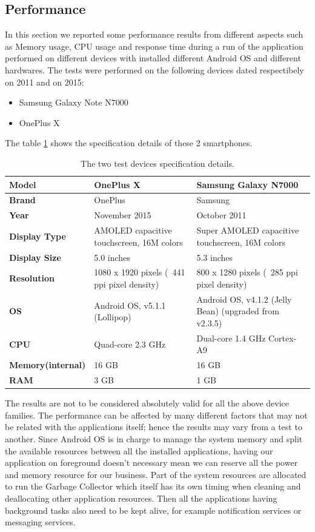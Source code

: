 \subsection{Performance}
In this section we reported some performance results from different aspects such as Memory usage, CPU usage and response time during a run of the application performed on different devices with installed different Android OS and different hardwares. The tests were performed on the following devices dated respectibely on 2011 and on 2015:
\begin{itemize}
	\item Samsung Galaxy Note N7000
	\item OnePlus X
\end{itemize}
The table \ref{tab10.1} shows the specification details of these 2 smartphones.\\
\begin{table}[h!]
	\centering
\begin{tabularx}{\textwidth}{|X|X|X|}
	\hline
		\textbf{Model}  & OnePlus X & Samsung Galaxy N7000  \\ \hline
		\textbf{Brand}  & OnePlus & Samsung \\ \hline
		\textbf{Year}  & November 2015 & October 2011 \\ \hline
		\textbf{Display Type}  & AMOLED capacitive touchscreen, 16M colors & Super AMOLED capacitive touchscreen, 16M colors \\ \hline
		\textbf{Display Size}  & 5.0 inches & 5.3 inches \\ \hline
		\textbf{Resolution}  & 1080 x 1920 pixels (~441 ppi pixel density) &  800 x 1280 pixels (~285 ppi pixel density) \\ \hline
		\textbf{OS}  & Android OS, v5.1.1 (Lollipop) & Android OS, v4.1.2 (Jelly Bean) (upgraded from v2.3.5) \\ \hline
		\textbf{CPU}  & Quad-core 2.3 GHz & Dual-core 1.4 GHz Cortex-A9 \\ \hline
		\textbf{Memory(internal)}\vline  & 16 GB & 16 GB \\ \hline
		\textbf{RAM}  & 3 GB & 1 GB \\ \hline
		
	\end{tabularx}
	\caption{The two test devices specification details.}
	\label{tab10.1}
\end{table}
The results are not to be considered absolutely valid for all the above device families. The performance can be affected by many different factors that may not be related with the applications itself; hence the results may vary from a test to another. Since Android OS is in charge to manage the system memory and split the available resources between all the installed applications, having our application on foreground doesn’t necessary mean we can reserve all the power and memory resource for our business. Part of the system resources are allocated to run the Garbage Collector which itself has its own timing when cleaning and deallocating other application resources. Then all the applications having background tasks also need to be kept alive, for example notification services or messaging services.\\
